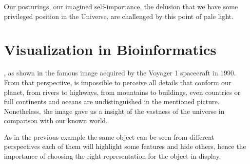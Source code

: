 \begin{savequote}[75mm] 
Our posturings, our imagined self-importance, the delusion that we have some privileged position in the Universe, are challenged by this point of pale light.
\end{savequote}

\chapter{Visualization in Bioinformatics} \label{section:visualization}

, as shown in the famous image acquired by the Voyager 1 spacecraft in 1990. From that perspective, is impossible to perceive  all details that conform our planet, from rivers to highways, from mountains to buildings, even countries or full continents and oceans are undistinguished in the mentioned picture. Nonetheless, the image gave us a insight of the vastness of the universe in comparison with our known world.

As in the previous example the same object can be seen from different perspectives each of them will highlight some features and hide others, hence the importance of choosing the right representation for the object in display.



